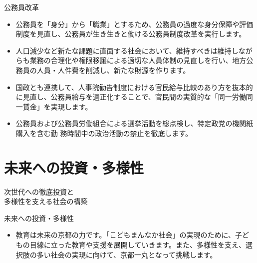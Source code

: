 \documentclass[dvipdfmx]{beamer}
\begin{document}
    \begin{frame}{公務員改革}{}
        \begin{small}
            \begin{itemize}
                \setlength{\itemsep}{2mm}
                \item 公務員を「身分」から「職業」とするため、公務員の過度な身分保障や評価制度を見直し、公務員が生き生きと働ける公務員制度改革を実行します。
                \item 人口減少など新たな課題に直面する社会において、維持すべきは維持しながらも業務の合理化や権限移譲による適切な人員体制の見直しを行い、地方公務員の人員・人件費を削減し、新たな財源を作ります。
                \item 国政とも連携して、人事院勧告制度における官民給与比較のあり方を抜本的に見直し、公務員給与を適正化することで、官民間の実質的な「同一労働同一賃金」を実現します。
                \item 公務員および公務員労働組合による選挙活動を総点検し、特定政党の機関紙購入を含む勤 務時間中の政治活動の禁止を徹底します。
            \end{itemize}
        \end{small}
    \end{frame}

\section{未来への投資・多様性}
    \begin{frame}{}{}
        \sectionpage
        \begin{center}
            \begin{large}
                \alert{次世代への徹底投資と}\\\alert{多様性を支える社会の構築}
            \end{large}
        \end{center}
    \end{frame}

    \begin{frame}{未来への投資・多様性}{}
        \begin{small}
            \begin{itemize}
                \setlength{\itemsep}{2mm}
                \item 教育は未来の京都の力です。「こどもまんなか社会」の実現のために、子どもの目線に立った教育や支援を展開していきます。また、多様性を支え、選択肢の多い社会の実現に向けて、京都一丸となって挑戦します。
            \end{itemize}
        \end{small}
    \end{frame}
\end{document}
